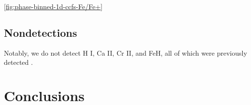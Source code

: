 \documentclass[twocolumn]{aastex631}
\begin{document}
        \ref{fig:phase-binned-1d-ccfs-Fe/Fe+}

                    
        \subsection{Nondetections}\label{subsec:Nondetections}

            Notably, we do not detect H I, Ca II, Cr II, and FeH, all of which were previously detected \citep{CasasayasBarris2019, Nugroho2020, Hoeijmakers2020, Kesseli2020}.





            
    \section{Conclusions}\label{sec:Conclusions}


    \vspace{5mm}




\appendix  
\end{document}

